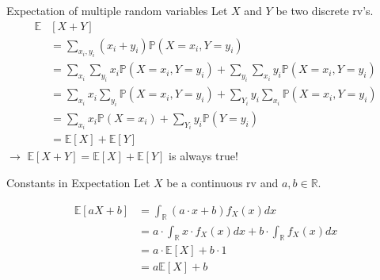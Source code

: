 \documentclass[11pt,pdf,ngerman,UKenglish]{beamer}%
\newcommand{\IR}{\mathds{R}}
\newcommand{\IP}{\mathbb{P}}
\newcommand{\IE}{{\mathbb{E}}}
\newcommand{\1}{\mathbb{1}}
\theoremstyle{thm}
\theoremstyle{def}
\begin{document}
%
%
%


\begin{frame}{Expectation of multiple random variables}
Let $X$ and $Y$ be two discrete rv's. 
\begin{align*}
\IE &[ X + Y]
\\ 
&= \sum_{x_i,y_i} (x_i+y_i) \IP( X = x_i, Y= y_i)
\\&
= \sum_{x_i} \sum_{y_i} x_i \IP(X=x_i, Y=y_i) + \sum_{y_i} \sum_{x_i} y_i \IP(X=x_i,Y=y_i)
\\&
= \sum_{x_i} x_i \sum_{y_i} \IP(X=x_i, Y=y_i) + \sum_{Y_i} y_i \sum_{x_i} \IP(X=x_i,Y=y_i)
\\&
= \sum_{x_i} x_i \IP(X=x_i) + \sum_{Y_i} y_i \IP(Y=y_i)
\\&
= \IE[X] + \IE[Y]
\end{align*}
$\to$ $\IE[X + Y] = \IE[X] + \IE[Y]$ is always true!
\end{frame}


\begin{frame}{Constants in Expectation}
Let $X$ be a continuous rv and $a,b \in \IR$.

\begin{align*}
\IE[ a X + b] 
&= \int_\IR (a \cdot x + b) f_X(x) dx
\\&
= a \cdot \int_\IR x \cdot f_X(x) dx + b \cdot \int_\IR f_X(x) dx
\\&
= a \cdot \IE[ X ] + b \cdot 1
\\&
= a \IE[X] + b
\end{align*}
\end{frame}
\end{document}

